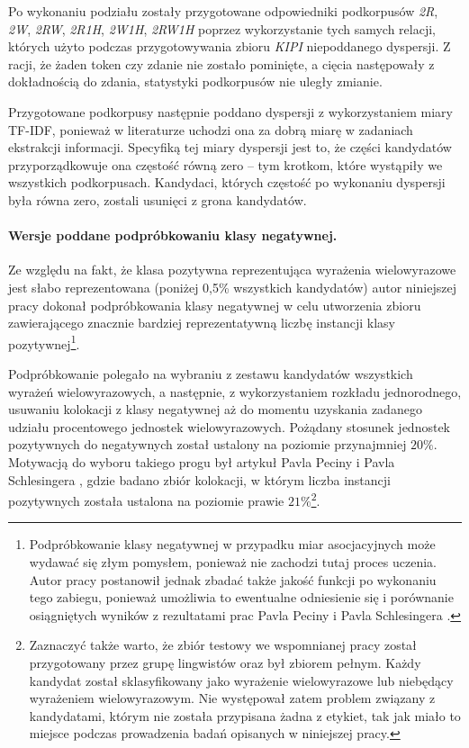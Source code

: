 \documentclass[11pt,a4paper]{llncs}
\begin{document}
\par
Po wykonaniu podziału zostały przygotowane odpowiedniki podkorpusów \emph{2R}, \emph{2W}, \emph{2RW}, \emph{2R1H}, \emph{2W1H}, \emph{2RW1H} poprzez wykorzystanie tych samych relacji, których użyto podczas przygotowywania zbioru \emph{KIPI} niepoddanego dyspersji.
Z racji, że żaden token czy zdanie nie zostało pominięte, a cięcia następowały z dokładnością do zdania, statystyki podkorpusów nie uległy zmianie.

\par
Przygotowane podkorpusy następnie poddano dyspersji z wykorzystaniem miary TF-IDF, ponieważ w literaturze uchodzi ona za dobrą miarę w zadaniach ekstrakcji informacji.
Specyfiką tej miary dyspersji jest to, że części kandydatów przyporządkowuje ona częstość równą zero -- tym krotkom, które wystąpiły we wszystkich podkorpusach.
Kandydaci, których częstość po wykonaniu dyspersji była równa zero, zostali usunięci z grona kandydatów.


\paragraph{Wersje poddane podpróbkowaniu klasy negatywnej.}
Ze względu na fakt, że klasa pozytywna reprezentująca wyrażenia wielowyrazowe jest słabo reprezentowana (poniżej 0,5\% wszystkich kandydatów) autor niniejszej pracy dokonał podpróbkowania klasy negatywnej w celu utworzenia zbioru zawierającego znacznie bardziej reprezentatywną liczbę instancji klasy pozytywnej\footnote{Podpróbkowanie klasy negatywnej w przypadku miar asocjacyjnych może wydawać się złym pomysłem, ponieważ nie zachodzi tutaj proces uczenia. Autor pracy postanowił jednak zbadać także jakość funkcji po wykonaniu tego zabiegu, ponieważ umożliwia to ewentualne odniesienie się i porównanie osiągniętych wyników z rezultatami prac Pavla Peciny i Pavla Schlesingera \cite{coling}.}.

\par
Podpróbkowanie polegało na wybraniu z zestawu kandydatów wszystkich wyrażeń wielowyrazowych, a następnie, z wykorzystaniem rozkładu jednorodnego, usuwaniu kolokacji z klasy negatywnej aż do momentu uzyskania zadanego udziału procentowego jednostek wielowyrazowych.
Pożądany stosunek jednostek pozytywnych do negatywnych został ustalony na poziomie przynajmniej $ 20\% $.
Motywacją do wyboru takiego progu był artykuł Pavla Peciny i Pavla Schlesingera \cite{coling}, gdzie badano zbiór kolokacji, w którym liczba instancji pozytywnych została ustalona na poziomie prawie $ 21\% $\footnote{Zaznaczyć także warto, że zbiór testowy we wspomnianej pracy został przygotowany przez grupę lingwistów oraz był zbiorem pełnym. Każdy kandydat został sklasyfikowany jako wyrażenie wielowyrazowe lub niebędący wyrażeniem wielowyrazowym. Nie występował zatem problem związany z kandydatami, którym nie została przypisana żadna z etykiet, tak jak miało to miejsce podczas prowadzenia badań opisanych w niniejszej pracy.}.
\end{document}
